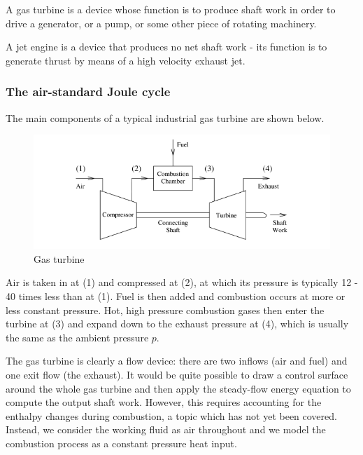 \documentclass{article}
\begin{document}
\begin{definition}
    A gas turbine is a device whose function is to produce shaft work in order to drive a generator, or a pump, or some other piece of rotating machinery.
\end{definition}

\begin{definition}
    A jet engine is a device that produces no net shaft work - its function is to generate thrust by means of a high velocity exhaust jet.
\end{definition}

\subsubsection{The air-standard Joule cycle}

The main components of a typical industrial gas turbine are shown below.

\begin{figure}[h]
    \centering
    \includegraphics{images/Screenshot 2024-04-03 213414.png}
    \caption{Gas turbine}
    \label{fig:enter-label}
\end{figure}

Air is taken in at (1) and compressed at (2), at which its pressure is typically 12 - 40 times less than at (1). Fuel is then added and combustion occurs at more or less constant pressure. Hot, high pressure combustion gases then enter the turbine at (3) and expand down to the exhaust pressure at (4), which is usually the same as the ambient pressure $p$.

The gas turbine is clearly a flow device: there are two inflows (air and fuel) and one exit flow
(the exhaust). It would be quite possible to draw a control surface around the whole gas turbine
and then apply the steady-flow energy equation to compute the output shaft work. However, this requires accounting
for the enthalpy changes during combustion, a topic which has not yet been covered. Instead, we
consider the working fluid as air throughout and we model the combustion process as a constant
pressure heat input.
\end{document}
